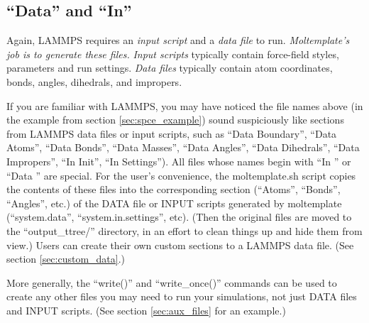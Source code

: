 \documentclass[11pt]{article}
\begin{document}
\subsection{``Data'' and ``In''}
\label{sec:DataIn}
Again, LAMMPS requires an \textit{input script} and a \textit{data file} 
to run.    
\textit{Moltemplate's job is to generate these files.}
\textit{Input scripts} typically contain
force-field styles, parameters and run settings.
\textit{Data files} typically contain atom 
coordinates, bonds, angles, dihedrals, and impropers.

If you are familiar with LAMMPS, 
you may have noticed the file names above
(in the example from section \ref{sec:spce_example})
sound suspiciously like sections from LAMMPS data files or input scripts, 
such as ``Data Boundary'', ``Data Atoms'', ``Data Bonds'', ``Data Masses'', ``Data Angles'', ``Data Dihedrals'', ``Data Impropers'', ``In Init'', ``In Settings'').
All files whose names begin with ``In '' or ``Data '' are special.
For the user's convenience, 
the moltemplate.sh script copies the contents 
of these files into the corresponding section 
(``Atoms'', ``Bonds'', ``Angles'', etc.)
of the 
DATA file or INPUT scripts generated by moltemplate 
(``system.data'', ``system.in.settings'', etc).
(Then the original files are moved to the ``output\_ttree/'' directory, 
 in an effort to clean things up and hide them from view.)
Users can create their own custom sections to a LAMMPS data file.
(See section \ref{sec:custom_data}.)

More generally, the ``write()'' and ``write\_once()'' commands can be used to
create any other files you may need to run your simulations,
not just DATA files and INPUT scripts.
(See section \ref{sec:aux_files} 
for an example.)
\end{document}
